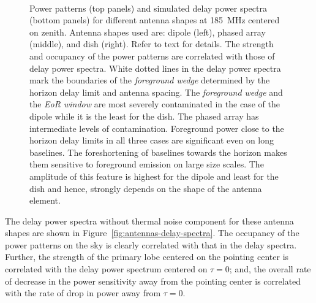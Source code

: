 \documentclass[preprint2,iop,numberedappendix]{emulateapj}
\begin{document}
\begin{figure}[htb]
\centering
{} \\
\caption{Power patterns (top panels) and simulated delay power spectra (bottom panels) for different antenna shapes at 185~MHz centered on zenith. Antenna shapes used are: dipole (left), phased array (middle), and dish (right). Refer to text for details. The strength and occupancy of the power patterns are correlated with those of delay power spectra. White dotted lines in the delay power spectra mark the boundaries of the {\it foreground wedge} determined by the horizon delay limit and antenna spacing. The {\it foreground wedge} and the {\it EoR window} are most severely contaminated in the case of the dipole while it is the least for the dish. The phased array has intermediate levels of contamination. Foreground power close to the horizon delay limits in all three cases are significant even on long baselines. The foreshortening of baselines towards the horizon makes them sensitive to foreground emission on large size scales. The amplitude of this feature is highest for the dipole and least for the dish and hence, strongly depends on the shape of the antenna element.}
\label{fig:aperture-shapes}
\end{figure}

The delay power spectra without thermal noise component for these antenna shapes are shown in Figure~\ref{fig:antennas-delay-spectra}. The occupancy of the power patterns on the sky is clearly correlated with that in the delay spectra. Further, the strength of the primary lobe centered on the pointing center is correlated with the delay power spectrum centered on $\tau=0$; and, the overall rate of decrease in the power sensitivity away from the pointing center is correlated with the rate of drop in power away from $\tau=0$. 
\end{document}
